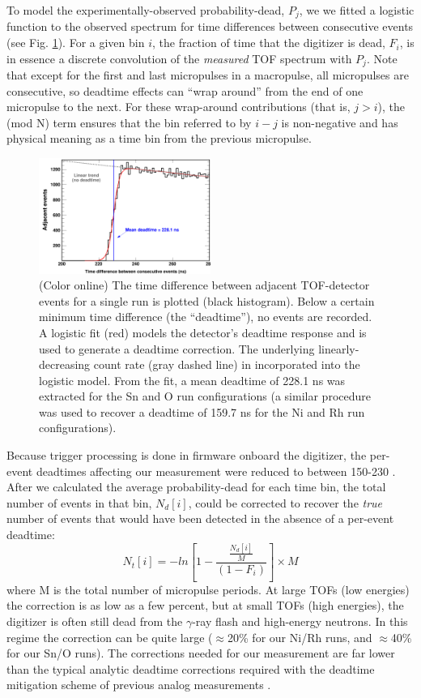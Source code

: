 \documentclass[twocolumn,secnumarabic,amssymb, nobibnotes, aps, prl,
superscriptaddress, nobalancelastpage]{revtex4}
\begin{document}
To model the experimentally-observed probability-dead, $P_{j}$, we
we fitted a logistic function to the observed spectrum for time
differences between consecutive events (see Fig.
\ref{TimeDifferenceBetweenEvents}). For a given bin $i$, the fraction of time that the 
digitizer is dead, $F_{i}$, is in essence a discrete convolution of the
\textit{measured} TOF spectrum with $P_{j}$. Note that except for the first and
last micropulses in a macropulse, all micropulses are consecutive, so deadtime effects can
``wrap around'' from the end of one micropulse to the next. For these wrap-around
contributions (that is, $j>i$), the (mod N) term ensures that the bin referred
to by $i-j$ is non-negative and has physical meaning as a time bin from the 
previous micropulse.
\begin{figure}
    \includegraphics[width=0.5\textwidth]{figures/TimeDifferenceBetweenEvents.png}
    \caption{(Color online) The time difference between adjacent TOF-detector
    events for a single run is plotted (black histogram). Below a certain
minimum time difference (the ``deadtime''), no events are recorded. A logistic
fit (red) models the detector's deadtime response and is used to generate a
deadtime correction. The underlying linearly-decreasing count rate (gray dashed
line) in incorporated into the logistic model. From the fit, a mean deadtime of
228.1 ns was extracted for the Sn and O run configurations (a similar
procedure was used to recover a deadtime of 159.7 ns for the Ni and Rh
run configurations).}
    \label{TimeDifferenceBetweenEvents}
\end{figure}

Because trigger processing is done in firmware onboard the digitizer,
the per-event deadtimes affecting our
measurement were reduced to between 150-230 \nano\second.
After we calculated the average probability-dead for each time bin,
the total number of events  in that bin, $N_{d}[i]$, could be
corrected to recover the \textit{true} number of events that would have been
detected in the absence of a per-event deadtime:
\begin{equation}
    N_{t}[i] = -ln\left[1-\frac{\frac{N_{d}[i]}{M}}{(1-F_{i})}\right]\times M
\end{equation}
where M is the total number of micropulse periods. At large TOFs (low energies) 
the correction is as low as a few percent,
but at small TOFs (high energies), the digitizer is often still dead
from the $\gamma$-ray flash and high-energy neutrons. In this regime
the correction can be quite large ($\approx$20\% for our Ni/Rh runs,
and $\approx$40\% for our Sn/O runs). The corrections needed for our measurement
are far lower than the typical analytic deadtime corrections required
with the deadtime mitigation scheme of previous analog measurements \cite{Finlay1993,
Abfalterer2001}.
\end{document}
